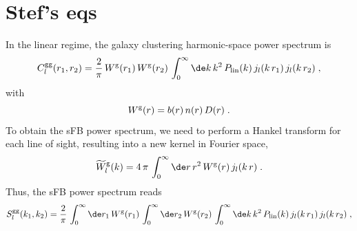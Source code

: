 \section{Stef's eqs}
In the linear regime, the galaxy clustering harmonic-space power spectrum is
\begin{equation}
    C_l^{\rm gg}(r_1,r_2) = \frac{2}{\pi}\,W^{\rm g}(r_1)\,W^{\rm g}(r_2)\,\int_0^{\infty}\de k\,k^2\,P_{\rm lin}(k)\,j_l(k\,r_1)\,j_l(k\,r_2)\;,
\end{equation}
with
\begin{equation}
    W^{\rm g}(r)=b(r)\,n(r)\,D(r)\;.
\end{equation}
To obtain the sFB power spectrum, we need to perform a Hankel transform for each line of sight, resulting into a new kernel in Fourier space,
\begin{equation}
    \widetilde W^{\rm g}_l(k)=4\,\pi\,\int_0^{\infty}\de r\,r^2\,W^{\rm g}(r)\,j_l(k\,r)\;.
\end{equation}
Thus, the sFB power spectrum reads
\begin{equation}
    S_l^{\rm gg}(k_1,k_2) = \frac{2}{\pi}\,\int_0^{\infty} \de r_1\,W^{\rm g}(r_1)\,\int_0^{\infty}\de r_2\,W^{\rm g}(r_2)\,\int_0^{\infty}\de k\,k^2\,P_{\rm lin}(k)\,j_l(k\,r_1)\,j_l(k\,r_2)\;,
\end{equation}